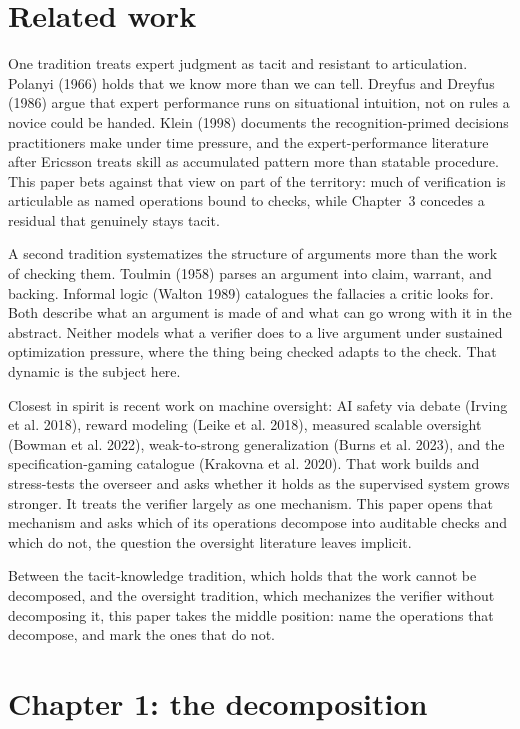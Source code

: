 \documentclass[
  11pt,
]{article}
\begin{document}
\section{Related work}\label{related-work}

One tradition treats expert judgment as tacit and resistant to
articulation. Polanyi (1966) holds that we know more than we can tell.
Dreyfus and Dreyfus (1986) argue that expert performance runs on
situational intuition, not on rules a novice could be handed. Klein (1998)
documents the recognition-primed decisions practitioners make under time
pressure, and the expert-performance literature after Ericsson treats
skill as accumulated pattern more than statable procedure. This paper bets
against that view on part of the territory: much of verification is
articulable as named operations bound to checks, while Chapter~3 concedes
a residual that genuinely stays tacit.

A second tradition systematizes the structure of arguments more than the
work of checking them. Toulmin (1958) parses an argument into claim,
warrant, and backing. Informal logic (Walton 1989) catalogues the
fallacies a critic looks for. Both describe what an argument is made of and
what can go wrong with it in the abstract. Neither models what a verifier
does to a live argument under sustained optimization pressure, where the
thing being checked adapts to the check. That dynamic is the subject here.

Closest in spirit is recent work on machine oversight: {AI} safety via
debate (Irving et al. 2018), reward modeling (Leike et al. 2018), measured
scalable oversight (Bowman et al. 2022), weak-to-strong generalization
(Burns et al. 2023), and the specification-gaming catalogue (Krakovna et
al. 2020). That work builds and stress-tests the overseer and asks whether
it holds as the supervised system grows stronger. It treats the verifier
largely as one mechanism. This paper opens that mechanism and asks which of
its operations decompose into auditable checks and which do not, the
question the oversight literature leaves implicit.

Between the tacit-knowledge tradition, which holds that the work cannot be
decomposed, and the oversight tradition, which mechanizes the verifier
without decomposing it, this paper takes the middle position: name the
operations that decompose, and mark the ones that do not.

\section{Chapter 1: the
decomposition}\label{chapter-1-the-decomposition}
\end{document}
